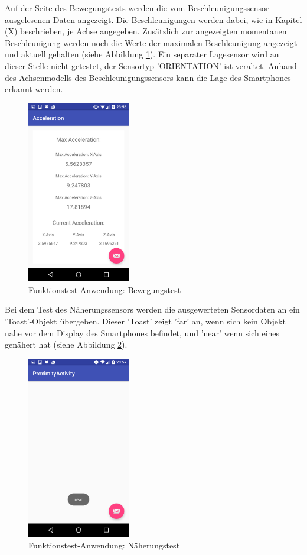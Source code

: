 Auf der Seite des Bewegungstests werden die vom Beschleunigungssensor ausgelesenen Daten angezeigt. Die Beschleunigungen werden dabei, wie in Kapitel (X) beschrieben, je Achse angegeben. Zusätzlich zur angezeigten momentanen Beschleunigung werden noch die Werte der maximalen Beschleunigung angezeigt und aktuell gehalten (siehe Abbildung \ref{fig:Accelerometer}). Ein separater Lagesensor wird an dieser Stelle nicht getestet, der Sensortyp 'ORIENTATION' ist veraltet. Anhand des Achsenmodells des Beschleunigungssensors kann die Lage des Smartphones erkannt werden. 
\clearpage

\begin{figure}[h]
	\centering
	\includegraphics[width=0.4\textwidth]{Bilder/Screenshots/Screenshot_20170214-235635.PNG}
	\caption{Funktionstest-Anwendung: Bewegungstest}
	\label{fig:Accelerometer}
\end{figure}

Bei dem Test des Näherungssensors werden die ausgewerteten Sensordaten an ein 'Toast'-Objekt übergeben. Dieser 'Toast' zeigt 'far' an, wenn sich kein Objekt nahe vor dem Display des Smartphones befindet, und 'near' wenn sich eines genähert hat (siehe Abbildung \ref{fig:Proximity}).

 \clearpage

\begin{figure}[h]
	\centering
	\includegraphics[width=0.4\textwidth]{Bilder/Screenshots/Screenshot_20170214-235744.PNG}
	\caption{Funktionstest-Anwendung: Näherungstest}
	\label{fig:Proximity}
\end{figure}